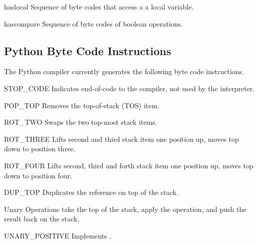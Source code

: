\begin{datadesc}{haslocal}
Sequence of byte codes that access a a local variable.
\end{datadesc}

\begin{datadesc}{hascompare}
Sequence of byte codes of boolean operations.
\end{datadesc}

\subsection{Python Byte Code Instructions}
\label{bytecodes}

The Python compiler currently generates the following byte code
instructions.


\begin{opcodedesc}{STOP_CODE}{}
Indicates end-of-code to the compiler, not used by the interpreter.
\end{opcodedesc}

\begin{opcodedesc}{POP_TOP}{}
Removes the top-of-stack (TOS) item.
\end{opcodedesc}

\begin{opcodedesc}{ROT_TWO}{}
Swaps the two top-most stack items.
\end{opcodedesc}

\begin{opcodedesc}{ROT_THREE}{}
Lifts second and third stack item one position up, moves top down
to position three.
\end{opcodedesc}

\begin{opcodedesc}{ROT_FOUR}{}
Lifts second, third and forth stack item one position up, moves top down to
position four.
\end{opcodedesc}

\begin{opcodedesc}{DUP_TOP}{}
Duplicates the reference on top of the stack.
\end{opcodedesc}

Unary Operations take the top of the stack, apply the operation, and
push the result back on the stack.

\begin{opcodedesc}{UNARY_POSITIVE}{}
Implements .
\end{opcodedesc}

